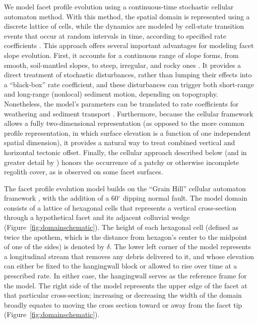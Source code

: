 We model facet profile evolution using a continuous-time stochastic cellular automaton method. With this method, the spatial domain is represented using a discrete lattice of cells, while the dynamics are modeled by cell-state transition events that occur at random intervals in time, according to specified rate coefficients \citep{narteau2001small,narteau2009setting}. This approach offers several important advantages for modeling facet slope evolution. First, it accounts for a continuous range of slope forms, from smooth, soil-mantled slopes, to steep, irregular, and rocky ones \citep{tucker2018lattice}. It provides a direct treatment of stochastic disturbances, rather than lumping their effects into a ``black-box'' rate coefficient, and these disturbances can trigger both short-range and long-range (nonlocal) sediment motion, depending on topography. Nonetheless, the model's parameters can be translated to rate coefficients for weathering  and sediment transport \citep{tucker2018lattice}. Furthermore, because the cellular framework allows a fully two-dimensional representation (as opposed to the more common profile representation, in which surface elevation is a function of one independent spatial dimension), it provides a natural way to treat combined vertical and horizontal tectonic offset. Finally, the cellular approach described below (and in greater detail by \citet{tucker2016celllab,tucker2018lattice}) honors the occurrence of a patchy or otherwise incomplete regolith cover, as is observed on some facet surfaces.

The facet profile evolution model builds on the ``Grain Hill'' cellular automaton framework \citep{tucker2018lattice}, with the addition of a 60$^\circ$ dipping normal fault. The model domain consists of a lattice of hexagonal cells that represents a vertical cross-section through a hypothetical facet and its adjacent colluvial wedge (Figure~\ref{fig:domainschematic}). The height of each hexagonal cell (defined as twice the apothem, which is the distance from hexagon's center to the midpoint of one of the sides) is denoted by $\delta$. The lower left corner of the model represents a longitudinal stream that removes any debris delivered to it, and whose elevation can either be fixed to the hangingwall block or allowed to rise over time at a prescribed rate. In either case, the hangingwall serves as the reference frame for the model. The right side of the model represents the upper edge of the facet at that particular cross-section; increasing or decreasing the width of the domain broadly equates to moving the cross section toward or away from the facet tip (Figure~\ref{fig:domainschematic}).

